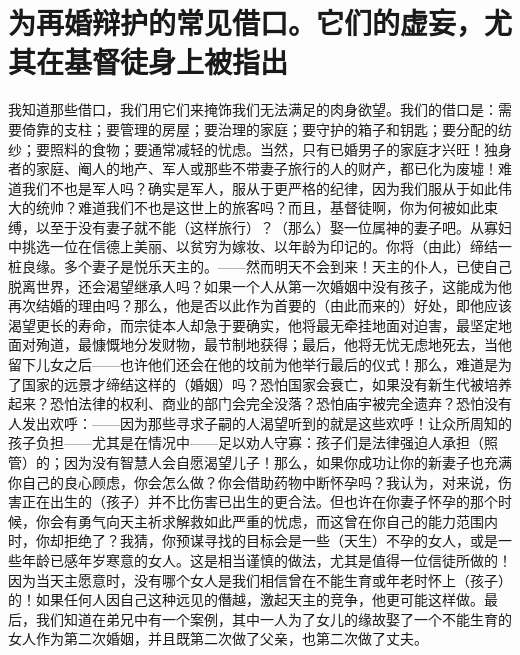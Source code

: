 \section{为再婚辩护的常见借口。它们的虚妄，尤其在基督徒身上被指出}

我知道那些借口，我们用它们来掩饰我们无法满足的肉身欲望。我们的借口是：需要倚靠的支柱；要管理的房屋；要治理的家庭；要守护的箱子和钥匙；要分配的纺纱；要照料的食物；要通常减轻的忧虑。当然，只有已婚男子的家庭才兴旺！独身者的家庭、阉人的地产、军人或那些不带妻子旅行的人的财产，都已化为废墟！难道我们不也是军人吗？确实是军人，服从于更严格的纪律，因为我们服从于如此伟大的统帅？难道我们不也是这世上的旅客吗？而且，基督徒啊，你为何被如此束缚，以至于没有妻子就不能（这样旅行）？（那么）娶一位属神的妻子吧。从寡妇中挑选一位在信德上美丽、以贫穷为嫁妆、以年龄为印记的。你将（由此）缔结一桩良缘。多个妻子是悦乐天主的。——然而明天不会到来！天主的仆人，已使自己脱离世界，还会渴望继承人吗？如果一个人从第一次婚姻中没有孩子，这能成为他再次结婚的理由吗？那么，他是否以此作为首要的（由此而来的）好处，即他应该渴望更长的寿命，而宗徒本人却急于要确实，他将最无牵挂地面对迫害，最坚定地面对殉道，最慷慨地分发财物，最节制地获得；最后，他将无忧无虑地死去，当他留下儿女之后——也许他们还会在他的坟前为他举行最后的仪式！那么，难道是为了国家的远景才缔结这样的（婚姻）吗？恐怕国家会衰亡，如果没有新生代被培养起来？恐怕法律的权利、商业的部门会完全没落？恐怕庙宇被完全遗弃？恐怕没有人发出欢呼：——因为那些寻求子嗣的人渴望听到的就是这些欢呼！让众所周知的孩子负担——尤其是在情况中——足以劝人守寡：孩子们是法律强迫人承担（照管）的；因为没有智慧人会自愿渴望儿子！那么，如果你成功让你的新妻子也充满你自己的良心顾虑，你会怎么做？你会借助药物中断怀孕吗？我认为，对来说，伤害正在出生的（孩子）并不比伤害已出生的更合法。但也许在你妻子怀孕的那个时候，你会有勇气向天主祈求解救如此严重的忧虑，而这曾在你自己的能力范围内时，你却拒绝了？我猜，你预谋寻找的目标会是一些（天生）不孕的女人，或是一些年龄已感年岁寒意的女人。这是相当谨慎的做法，尤其是值得一位信徒所做的！因为当天主愿意时，没有哪个女人是我们相信曾在不能生育或年老时怀上（孩子）的！如果任何人因自己这种远见的僭越，激起天主的竞争，他更可能这样做。最后，我们知道在弟兄中有一个案例，其中一人为了女儿的缘故娶了一个不能生育的女人作为第二次婚姻，并且既第二次做了父亲，也第二次做了丈夫。\par


